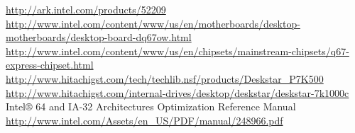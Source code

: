 {}
{}
\begin{thebibliography}{99}
 \url{http://ark.intel.com/products/52209}
 \url{http://www.intel.com/content/www/us/en/motherboards/desktop-motherboards/desktop-board-dq67ow.html}
 \url{http://www.intel.com/content/www/us/en/chipsets/mainstream-chipsets/q67-express-chipset.html}
 \url{http://www.hitachigst.com/tech/techlib.nsf/products/Deskstar_P7K500}
 \url{http://www.hitachigst.com/internal-drives/desktop/deskstar/deskstar-7k1000c}
 Intel® 64 and IA-32 Architectures Optimization Reference Manual \url{http://www.intel.com/Assets/en_US/PDF/manual/248966.pdf}
\end{thebibliography}

